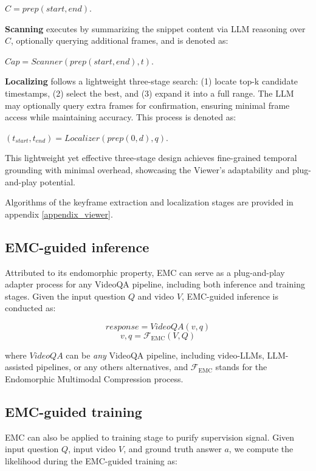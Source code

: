 \begin{center}
$C = prep(start, end).$
\end{center}

\textbf{Scanning} executes by summarizing the snippet content via LLM reasoning over $C$, optionally querying additional frames, and is denoted as:
\begin{center}
$Cap = Scanner(prep(start, end), t).$
\end{center}

\textbf{Localizing} follows a lightweight three-stage search: (1) locate top-k candidate timestamps, (2) select the best, and (3) expand it into a full range. The LLM may optionally query extra frames for confirmation, ensuring minimal frame access while maintaining accuracy. This process is denoted as:
\begin{center}
$(t_{start}, t_{end}) = Localizer(prep(0, d), q).$
\end{center}

This lightweight yet effective three-stage design achieves fine-grained temporal grounding with minimal overhead, showcasing the Viewer’s adaptability and plug-and-play potential.

Algorithms of the keyframe extraction and localization stages are provided in appendix \ref{appendix_viewer}.


\subsection{EMC-guided inference}
\label{subsection:emc-guided-inference}

Attributed to its endomorphic property, EMC can serve as a plug-and-play adapter process for any VideoQA pipeline, including both inference and training stages. Given the input question $Q$ and video $V$, EMC-guided inference is conducted as:

$$ response = VideoQA(v, q) $$
$$ v, q = \mathcal{F}_{\text{EMC}}(V, Q) $$

where $VideoQA$ can be \emph{any} VideoQA pipeline, including video-LLMs, LLM-assisted pipelines, or any others alternatives, and $\mathcal{F}_{\text{EMC}}$ stands for the Endomorphic Multimodal Compression process. 


\subsection{EMC-guided training}
\label{subsection:emc-guided-training}
EMC can also be applied to training stage to purify supervision signal. Given input question $Q$, input video $V$, and ground truth answer $a$, we compute the likelihood during the EMC-guided training as:

